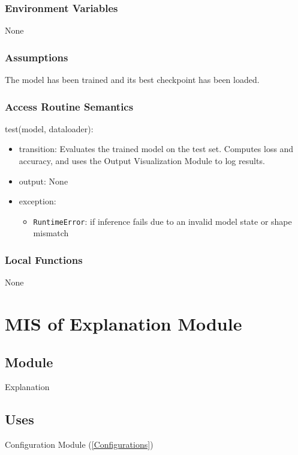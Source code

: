 \documentclass[12pt, titlepage]{article}
\begin{document}
\subsubsection{Environment Variables}
None

\subsubsection{Assumptions}
The model has been trained and its best checkpoint has been loaded.

\subsubsection{Access Routine Semantics}

\noindent test(model, dataloader):
\begin{itemize}
\item transition: Evaluates the trained model on the test set. Computes loss and accuracy, and uses the Output Visualization Module to log results.
\item output: None
\item exception:     
    \begin{itemize}
        \item \texttt{RuntimeError}: if inference fails due to an invalid model state or shape mismatch
    \end{itemize}
\end{itemize}

\subsubsection{Local Functions}
None














\section{MIS of Explanation Module} \label{Explanation}

\subsection{Module}
Explanation

\subsection{Uses}
Configuration Module (\ref{Configurations})
\end{document}
